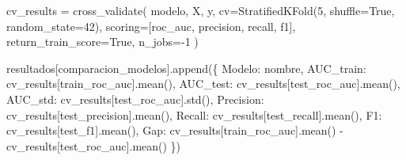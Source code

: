 \documentclass[
  doc,
  floatsintext,
  longtable,
  a4paper,
  nolmodern,
  notxfonts,
  notimes,
  12pt,
  colorlinks=true,linkcolor=blue,citecolor=blue,urlcolor=blue]{apa7}
\newenvironment{Shaded}{\begin{snugshade}}{\end{snugshade}}
\newcommand{\DecValTok}[1]{\textcolor[rgb]{0.68,0.00,0.00}{#1}}
\newcommand{\NormalTok}[1]{\textcolor[rgb]{0.00,0.23,0.31}{#1}}
\newcommand{\OperatorTok}[1]{\textcolor[rgb]{0.37,0.37,0.37}{#1}}
\newcommand{\StringTok}[1]{\textcolor[rgb]{0.13,0.47,0.30}{#1}}
\newcommand{\VariableTok}[1]{\textcolor[rgb]{0.07,0.07,0.07}{#1}}
\begin{document}
\begin{Shaded}
\begin{Highlighting}[]
\NormalTok{        cv\_results }\OperatorTok{=}\NormalTok{ cross\_validate(}
\NormalTok{            modelo, X, y,}
\NormalTok{            cv}\OperatorTok{=}\NormalTok{StratifiedKFold(}\DecValTok{5}\NormalTok{, shuffle}\OperatorTok{=}\VariableTok{True}\NormalTok{, random\_state}\OperatorTok{=}\DecValTok{42}\NormalTok{),}
\NormalTok{            scoring}\OperatorTok{=}\NormalTok{[}\StringTok{\textquotesingle{}roc\_auc\textquotesingle{}}\NormalTok{, }\StringTok{\textquotesingle{}precision\textquotesingle{}}\NormalTok{, }\StringTok{\textquotesingle{}recall\textquotesingle{}}\NormalTok{, }\StringTok{\textquotesingle{}f1\textquotesingle{}}\NormalTok{],}
\NormalTok{            return\_train\_score}\OperatorTok{=}\VariableTok{True}\NormalTok{,}
\NormalTok{            n\_jobs}\OperatorTok{={-}}\DecValTok{1}
\NormalTok{        )}
        
\NormalTok{        resultados[}\StringTok{\textquotesingle{}comparacion\_modelos\textquotesingle{}}\NormalTok{].append(\{}
            \StringTok{\textquotesingle{}Modelo\textquotesingle{}}\NormalTok{: nombre,}
            \StringTok{\textquotesingle{}AUC\_train\textquotesingle{}}\NormalTok{: cv\_results[}\StringTok{\textquotesingle{}train\_roc\_auc\textquotesingle{}}\NormalTok{].mean(),}
            \StringTok{\textquotesingle{}AUC\_test\textquotesingle{}}\NormalTok{: cv\_results[}\StringTok{\textquotesingle{}test\_roc\_auc\textquotesingle{}}\NormalTok{].mean(),}
            \StringTok{\textquotesingle{}AUC\_std\textquotesingle{}}\NormalTok{: cv\_results[}\StringTok{\textquotesingle{}test\_roc\_auc\textquotesingle{}}\NormalTok{].std(),}
            \StringTok{\textquotesingle{}Precision\textquotesingle{}}\NormalTok{: cv\_results[}\StringTok{\textquotesingle{}test\_precision\textquotesingle{}}\NormalTok{].mean(),}
            \StringTok{\textquotesingle{}Recall\textquotesingle{}}\NormalTok{: cv\_results[}\StringTok{\textquotesingle{}test\_recall\textquotesingle{}}\NormalTok{].mean(),}
            \StringTok{\textquotesingle{}F1\textquotesingle{}}\NormalTok{: cv\_results[}\StringTok{\textquotesingle{}test\_f1\textquotesingle{}}\NormalTok{].mean(),}
            \StringTok{\textquotesingle{}Gap\textquotesingle{}}\NormalTok{: cv\_results[}\StringTok{\textquotesingle{}train\_roc\_auc\textquotesingle{}}\NormalTok{].mean() }\OperatorTok{{-}}\NormalTok{ cv\_results[}\StringTok{\textquotesingle{}test\_roc\_auc\textquotesingle{}}\NormalTok{].mean()}
\NormalTok{        \})}
        

\end{Highlighting}
\end{Shaded}
\end{document}
